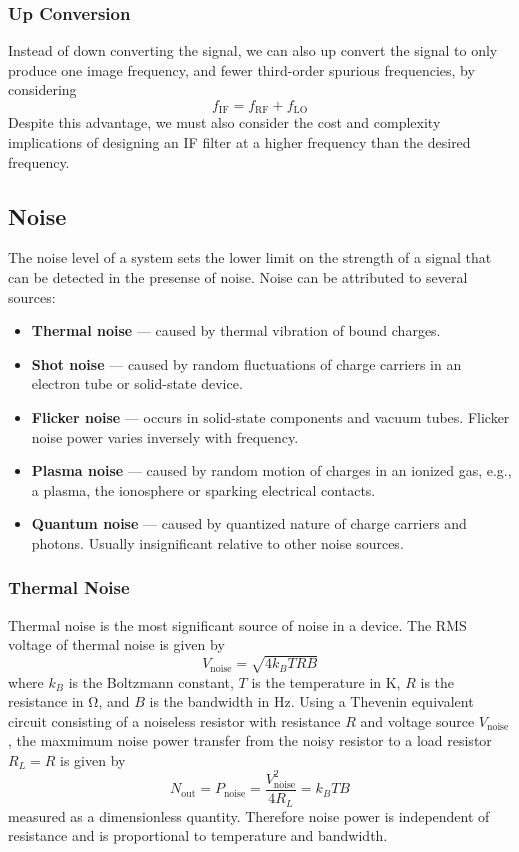 \documentclass{article}
\begin{document}
\subsubsection{Up Conversion}
Instead of down converting the signal, we can also up convert the
signal to only produce one image frequency, and fewer third-order
spurious frequencies, by considering
\begin{equation*}
    f_{\mathrm{IF}} = f_{\mathrm{RF}} + f_{\mathrm{LO}}
\end{equation*}
Despite this advantage, we must also consider the cost and complexity
implications of designing an IF filter at a higher frequency than the
desired frequency.
\subsection{Noise}
The noise level of a system sets the lower limit on the strength of a
signal that can be detected in the presense of noise. Noise can be
attributed to several sources:
\begin{itemize}
    \item \textbf{Thermal noise} --- caused by thermal vibration of bound
          charges.
    \item \textbf{Shot noise} --- caused by random fluctuations of
          charge carriers in an electron tube or solid-state device.
    \item \textbf{Flicker noise} --- occurs in solid-state components and
          vacuum tubes. Flicker noise power varies inversely with frequency.
    \item \textbf{Plasma noise} --- caused by random motion of charges in
          an ionized gas, e.g., a plasma, the ionosphere or sparking electrical
          contacts.
    \item \textbf{Quantum noise} --- caused by quantized nature of charge
          carriers and photons. Usually insignificant relative to other noise
          sources.
\end{itemize}
\subsubsection{Thermal Noise}
Thermal noise is the most significant source of noise in a device. The
RMS voltage of thermal noise is given by
\begin{equation*}
    V_{\mathrm{noise}} = \sqrt{4 k_B T R B}
\end{equation*}
where \(k_B\) is the Boltzmann constant, \(T\) is the temperature in
\unit{K}, \(R\) is the resistance in \unit{\ohm}, and \(B\) is the
bandwidth in \unit{Hz}. Using a Thevenin equivalent circuit consisting
of a noiseless resistor with resistance \(R\) and voltage source
\(V_{\mathrm{noise}}\), the maxmimum noise power transfer from the noisy
resistor to a load resistor \(R_L = R\) is given by
\begin{equation*}
    N_\mathrm{out} = P_{\mathrm{noise}} = \frac{V_{\mathrm{noise}}^2}{4R_L} = k_B T B
\end{equation*}
measured as a dimensionless quantity. Therefore noise power is
independent of resistance and is proportional to temperature and bandwidth.
\end{document}
